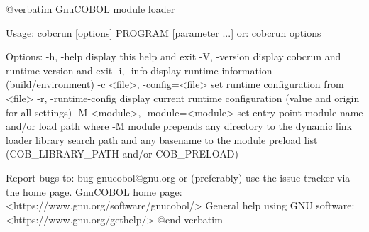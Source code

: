 @verbatim
GnuCOBOL module loader

Usage: cobcrun [options] PROGRAM [parameter ...]
  or:  cobcrun options

Options:
  -h, -help                      display this help and exit
  -V, -version                   display cobcrun and runtime version and exit
  -i, -info                      display runtime information (build/environment)
  -c <file>, -config=<file>      set runtime configuration from <file>
  -r, -runtime-config            display current runtime configuration
                                 (value and origin for all settings)
  -M <module>, -module=<module>  set entry point module name and/or load path
                                 where -M module prepends any directory to the
                                 dynamic link loader library search path
                                 and any basename to the module preload list
                                 (COB_LIBRARY_PATH and/or COB_PRELOAD)

Report bugs to: bug-gnucobol@gnu.org
or (preferably) use the issue tracker via the home page.
GnuCOBOL home page: <https://www.gnu.org/software/gnucobol/>
General help using GNU software: <https://www.gnu.org/gethelp/>
@end verbatim
